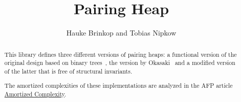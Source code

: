 \documentclass[11pt,a4paper]{article}
\begin{document}
\title{Pairing Heap}
\author{Hauke Brinkop and Tobias Nipkow}
\maketitle

\begin{abstract}
  This library defines three different versions of pairing heaps: a
  functional version of the original design based on binary
  trees~\cite{FredmanSST86}, the version by Okasaki~\cite{Okasaki} and
  a modified version of the latter that is free of structural invariants.

The amortized complexities of these implementations are analyzed in the AFP article
\href{http://isa-afp.org/entries/Amortized_Complexity.shtml}{Amortized Complexity}.
\end{abstract}

\tableofcontents





\end{document}
